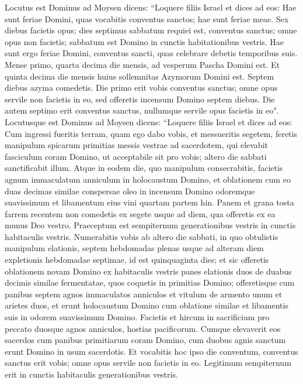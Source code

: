 \begin{biblechapter}  
\verse Locutus est Dominus ad Moysen dicens: 
\verse “Loquere filiis Israel et dices ad eos: Hae sunt feriae Domini, quas vocabitis conventus sanctos; hae sunt feriae meae. 
\verse Sex diebus facietis opus; dies septimus sabbatum requiei est, conventus sanctus; omne opus non facietis; sabbatum est Domino in cunctis habitationibus vestris. 
\verse Hae sunt ergo feriae Domini, conventus sancti, quas celebrare debetis temporibus suis. 
\verse Mense primo, quarta decima die mensis, ad vesperum Pascha Domini est. 
\verse Et quinta decima die mensis huius sollemnitas Azymorum Domini est. Septem diebus azyma comedetis. 
\verse Die primo erit vobis conventus sanctus; omne opus servile non facietis in eo, 
\verse sed offeretis incensum Domino septem diebus. Die autem septimo erit conventus sanctus, nullumque servile opus facietis in eo". 
\verse Locutusque est Dominus ad Moysen dicens: 
\verse “Loquere filiis Israel et dices ad eos: Cum ingressi fueritis terram, quam ego dabo vobis, et messueritis segetem, feretis manipulum spicarum primitias messis vestrae ad sacerdotem,  
\verse qui elevabit fasciculum coram Domino, ut acceptabile sit pro vobis; altero die sabbati sanctificabit illum. 
\verse Atque in eodem die, quo manipulum consecrabitis, facietis agnum immaculatum anniculum in holocaustum Domino,  
\verse et oblationem cum eo duas decimas similae conspersae oleo in incensum Domino odoremque suavissimum et libamentum eius vini quartam partem hin. 
\verse Panem et grana tosta farrem recentem non comedetis ex segete usque ad diem, qua offeretis ex ea munus Deo vestro. Praeceptum est sempiternum generationibus vestris in cunctis habitaculis vestris. 
\verse Numerabitis vobis ab altero die sabbati, in quo obtulistis manipulum elationis, septem hebdomadas plenas 
\verse usque ad alteram diem expletionis hebdomadae septimae, id est quinquaginta dies; et sic offeretis oblationem novam Domino 
\verse ex habitaculis vestris panes elationis duos de duabus decimis similae fermentatae, quos coquetis in primitias Domino; 
\verse offeretisque cum panibus septem agnos immaculatos anniculos et vitulum de armento unum et arietes duos, et erunt holocaustum Domino cum oblatione similae et libamentis suis in odorem suavissimum Domino. 
\verse Facietis et hircum in sacrificium pro peccato duosque agnos anniculos, hostias pacificorum. 
\verse Cumque elevaverit eos sacerdos cum panibus primitiarum coram Domino, cum duobus agnis sanctum erunt Domino in usum sacerdotis. 
\verse Et vocabitis hoc ipso die conventum, conventus sanctus erit vobis; omne opus servile non facietis in eo. Legitimum sempiternum erit in cunctis habitaculis generationibus vestris. 

\end{biblechapter}
